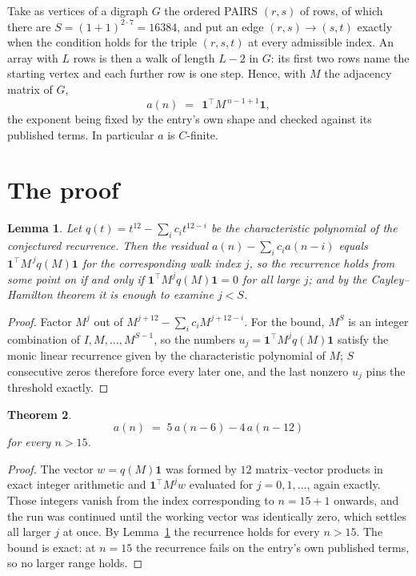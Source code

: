 \documentclass[11pt,a4paper]{article}
\theoremstyle{plain}
\newtheorem{theorem}{Theorem}
\newtheorem{lemma}[theorem]{Lemma}
\theoremstyle{definition}
\begin{document}
Take as vertices of a digraph $G$ the ordered PAIRS $(r,s)$ of rows, of which there are
$S=(1+1)^{2\cdot7}=16384$, and put an edge $(r,s)\to(s,t)$ exactly when the condition
holds for the triple $(r,s,t)$ at every admissible index. An array with $L$ rows is then a
walk of length $L-2$ in $G$: its first two rows name the starting vertex and each further
row is one step. Hence, with $M$ the adjacency matrix of $G$,
\[
a(n)\;=\;\,\mathbf{1}^{\!\top}M^{\,n-1+1}\mathbf{1},
\]
the exponent being fixed by the entry's own shape and checked against its published terms.
In particular $a$ is $C$-finite.

\section{The proof}

\begin{lemma}\label{lem:crit}
Let $q(t)=t^{12}-\sum_i c_it^{12-i}$ be the characteristic polynomial of the
conjectured recurrence. Then the residual $a(n)-\sum_ic_ia(n-i)$ equals
$\mathbf{1}^{\!\top}M^{\,j}q(M)\mathbf{1}$ for the corresponding walk index
$j$, so the recurrence holds from some point on if and only if
$\mathbf{1}^{\!\top}M^{j}q(M)\mathbf{1}=0$ for all large $j$; and by the
Cayley--Hamilton theorem it is enough to examine $j<S$.
\end{lemma}

\begin{proof}
Factor $M^{j}$ out of $M^{j+12}-\sum_ic_iM^{j+12-i}$. For the bound, $M^{S}$
is an integer combination of $I,M,\dots,M^{S-1}$, so the numbers
$u_j=\mathbf{1}^{\!\top}M^{j}q(M)\mathbf{1}$ satisfy the monic linear recurrence given by
the characteristic polynomial of $M$; $S$ consecutive zeros therefore force every later one,
and the last nonzero $u_j$ pins the threshold exactly.
\end{proof}

\begin{theorem}
\[
a(n)\;=\;5\,a(n-6) - 4\,a(n-12)
\]
for every $n>15$.
\end{theorem}

\begin{proof}
The vector $w=q(M)\mathbf{1}$ was formed by $12$ matrix--vector products in exact
integer arithmetic and $\mathbf{1}^{\!\top}M^{j}w$ evaluated for $j=0,1,\dots$, again
exactly. Those integers vanish from the index corresponding to $n=15+1$ onwards, and the
run was continued until the working vector was identically zero, which settles all larger $j$
at once. By Lemma~\ref{lem:crit} the recurrence holds for every $n>15$. The bound is exact: at $n=15$ the recurrence fails on the entry's own published terms, so no larger range holds.
\end{proof}
\end{document}
